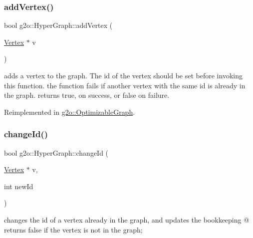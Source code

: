 \mbox{\label{classg2o_1_1_hyper_graph_a7ef87ba3479827b24c6fc29c5fc3aa21}} 
\subsubsection{\texorpdfstring{add\+Vertex()}{addVertex()}}
{\footnotesize\ttfamily bool g2o\+::\+Hyper\+Graph\+::add\+Vertex (\begin{DoxyParamCaption}\item[{\mbox{\hyperlink{classg2o_1_1_hyper_graph_1_1_vertex}{Vertex}} $\ast$}]{v }\end{DoxyParamCaption})\hspace{0.3cm}{\ttfamily [virtual]}}

adds a vertex to the graph. The id of the vertex should be set before invoking this function. the function fails if another vertex with the same id is already in the graph. returns true, on success, or false on failure. 

Reimplemented in \mbox{\hyperlink{structg2o_1_1_optimizable_graph_ac6f41f49fe6148fbe17133d10bf29b4c}{g2o\+::\+Optimizable\+Graph}}.

\mbox{\label{classg2o_1_1_hyper_graph_a74f0d7392e67762a85799db72a58a94c}} 
\subsubsection{\texorpdfstring{change\+Id()}{changeId()}}
{\footnotesize\ttfamily bool g2o\+::\+Hyper\+Graph\+::change\+Id (\begin{DoxyParamCaption}\item[{\mbox{\hyperlink{classg2o_1_1_hyper_graph_1_1_vertex}{Vertex}} $\ast$}]{v,  }\item[{int}]{new\+Id }\end{DoxyParamCaption})\hspace{0.3cm}{\ttfamily [virtual]}}

changes the id of a vertex already in the graph, and updates the bookkeeping @ returns false if the vertex is not in the graph; \mbox{\label{classg2o_1_1_hyper_graph_a6b629dff2928dbd704ca81f24858e72f}} 
